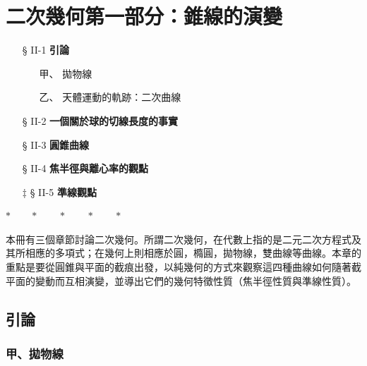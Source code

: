 
\section{二次幾何\texorpdfstring{\quad }{ }第一部分：錐線的演變}
\label{sec:b4s-ch2}

\begin{center}
\begin{minipage}{0.75\textwidth}
\begin{itemize}[leftmargin=2em, itemsep=0.3em]
  \item[§ II-1] \textbf{引論}
  \begin{itemize}[leftmargin=2em, itemsep=0.2em]
    \item[甲、] 拋物線
    \item[乙、] 天體運動的軌跡：二次曲線
  \end{itemize}
  \item[§ II-2] \textbf{一個關於球的切線長度的事實}
  \item[§ II-3] \textbf{圓錐曲線}
  \item[§ II-4] \textbf{焦半徑與離心率的觀點}
  \item[$\ddagger$ § II-5] \textbf{準線觀點}
\end{itemize}
\end{minipage}
\end{center}

\begin{center}
$* \qquad * \qquad * \qquad * \qquad *$
\end{center}

本冊有三個章節討論二次幾何。所謂二次幾何，在代數上指的是二元二次方程式及其所相應的多項式；在幾何上則相應於圓，橢圓，拋物線，雙曲線等曲線。本章的重點是要從圓錐與平面的截痕出發，以純幾何的方式來觀察這四種曲線如何隨著截平面的變動而互相演變，並導出它們的幾何特徵性質（焦半徑性質與準線性質）。

\subsection{引論}
\label{sec:b4s-2-1}

\subsubsection*{甲、拋物線}

